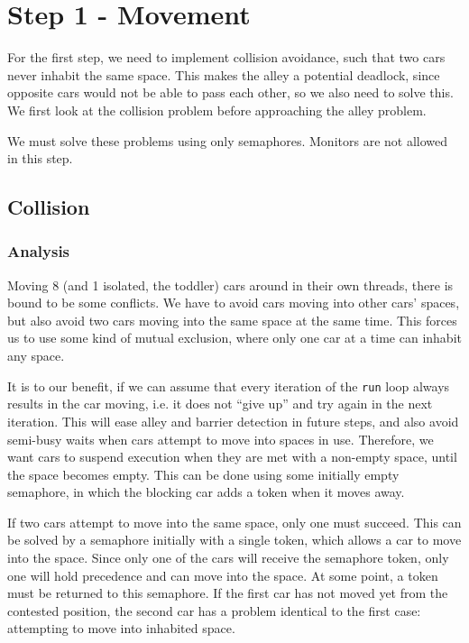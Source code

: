 \section{Step 1 - Movement}
For the first step, we need to implement collision avoidance, such that two cars never inhabit the same space. This makes the alley a potential deadlock, since opposite cars would not be able to pass each other, so we also need to solve this. We first look at the collision problem before approaching the alley problem.

We must solve these problems using only semaphores. Monitors are not allowed in this step.

\subsection{Collision}
\subsubsection{Analysis}
Moving 8 (and 1 isolated, the toddler) cars around in their own threads, there is bound to be some conflicts. We have to avoid cars moving into other cars' spaces, but also avoid two cars moving into the same space at the same time. This forces us to use some kind of mutual exclusion, where only one car at a time can inhabit any space.

It is to our benefit, if we can assume that every iteration of the \texttt{run} loop always results in the car moving, i.e. it does not ``give up'' and try again in the next iteration. This will ease alley and barrier detection in future steps, and also avoid semi-busy waits when cars attempt to move into spaces in use. Therefore, we want cars to suspend execution when they are met with a non-empty space, until the space becomes empty. This can be done using some initially empty semaphore, in which the blocking car adds a token when it moves away.

If two cars attempt to move into the same space, only one must succeed. This can be solved by a semaphore initially with a single token, which allows a car to move into the space. Since only one of the cars will receive the semaphore token, only one will hold precedence and can move into the space. At some point, a token must be returned to this semaphore. If the first car has not moved yet from the contested position, the second car has a problem identical to the first case: attempting to move into inhabited space.

